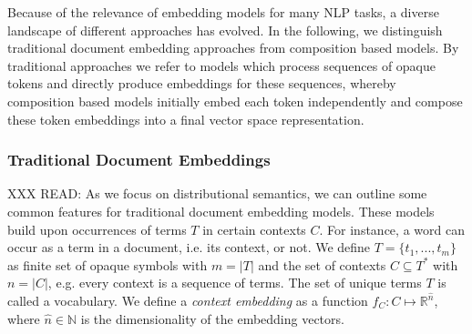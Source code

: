 Because of the relevance of embedding models for many \ac{NLP} tasks, a diverse landscape of different approaches has evolved. In the following, we distinguish traditional document embedding approaches from composition based models. By traditional approaches we refer to models which process sequences of opaque tokens and directly produce embeddings for these sequences, whereby composition based models initially embed each token independently and compose these token embeddings into a final vector space representation.   

\subsubsection{Traditional Document Embeddings}
\label{subsec:doc_embedding}
 XXX READ: \autocite{turney_frequency_2010}
As we focus on distributional semantics, we can outline some common features for traditional document embedding models. These models build upon occurrences of terms $T$ in certain contexts $C$. For instance, a word can occur as a term in a document, i.e. its context, or not. We define $T = \{t_1, ..., t_m\}$ as finite set of opaque symbols with $m = |T|$ and the set of contexts $C \subseteq T^*$ 
with $n = |C|$, e.g. every context is a sequence of terms. 
The set of unique terms $T$ is called a vocabulary.
We define a \textit{context embedding} as a function $f_C:C \mapsto \mathbb{R}^{\hat{n}}$, where $\hat{n} \in \mathbb{N}$ is the  dimensionality of the embedding vectors. 

